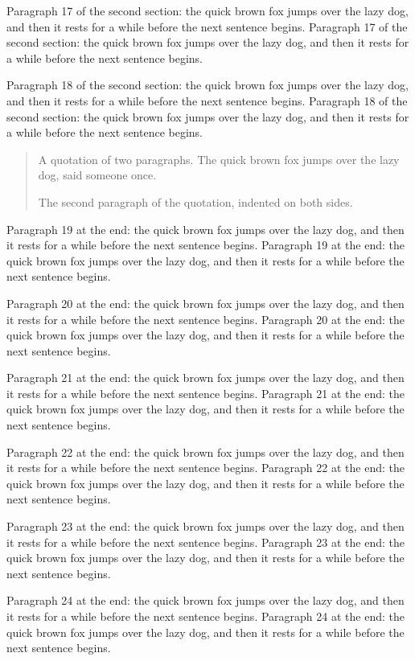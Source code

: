 \documentclass{article}
\begin{document}
Paragraph 17 of the second section: the quick brown fox jumps over the lazy dog, and then it rests for a while before the next sentence begins. Paragraph 17 of the second section: the quick brown fox jumps over the lazy dog, and then it rests for a while before the next sentence begins. 

Paragraph 18 of the second section: the quick brown fox jumps over the lazy dog, and then it rests for a while before the next sentence begins. Paragraph 18 of the second section: the quick brown fox jumps over the lazy dog, and then it rests for a while before the next sentence begins. 

\begin{quote}
A quotation of two paragraphs. The quick brown fox jumps over the lazy dog, said someone once.

The second paragraph of the quotation, indented on both sides.
\end{quote}
Paragraph 19 at the end: the quick brown fox jumps over the lazy dog, and then it rests for a while before the next sentence begins. Paragraph 19 at the end: the quick brown fox jumps over the lazy dog, and then it rests for a while before the next sentence begins. 

Paragraph 20 at the end: the quick brown fox jumps over the lazy dog, and then it rests for a while before the next sentence begins. Paragraph 20 at the end: the quick brown fox jumps over the lazy dog, and then it rests for a while before the next sentence begins. 

Paragraph 21 at the end: the quick brown fox jumps over the lazy dog, and then it rests for a while before the next sentence begins. Paragraph 21 at the end: the quick brown fox jumps over the lazy dog, and then it rests for a while before the next sentence begins. 

Paragraph 22 at the end: the quick brown fox jumps over the lazy dog, and then it rests for a while before the next sentence begins. Paragraph 22 at the end: the quick brown fox jumps over the lazy dog, and then it rests for a while before the next sentence begins. 

Paragraph 23 at the end: the quick brown fox jumps over the lazy dog, and then it rests for a while before the next sentence begins. Paragraph 23 at the end: the quick brown fox jumps over the lazy dog, and then it rests for a while before the next sentence begins. 

Paragraph 24 at the end: the quick brown fox jumps over the lazy dog, and then it rests for a while before the next sentence begins. Paragraph 24 at the end: the quick brown fox jumps over the lazy dog, and then it rests for a while before the next sentence begins. 
\end{document}
